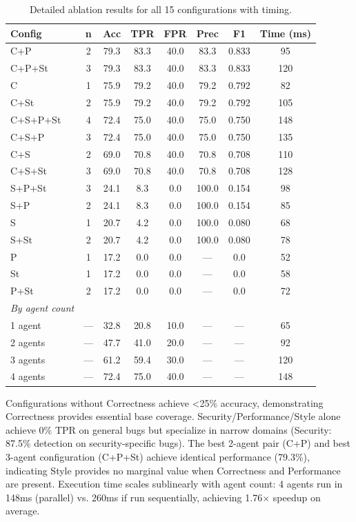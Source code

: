 \documentclass[10pt,twocolumn]{article}
\begin{document}
\begin{table}[h]
\centering
\caption{Detailed ablation results for all 15 configurations with timing.}
\label{tab:ablation_full}
\small
\begin{tabular}{@{}lccccccc@{}}
\toprule
\textbf{Config} & \textbf{n} & \textbf{Acc} & \textbf{TPR} & \textbf{FPR} & \textbf{Prec} & \textbf{F1} & \textbf{Time (ms)} \\
\midrule
C+P & 2 & 79.3 & 83.3 & 40.0 & 83.3 & 0.833 & 95 \\
C+P+St & 3 & 79.3 & 83.3 & 40.0 & 83.3 & 0.833 & 120 \\
C & 1 & 75.9 & 79.2 & 40.0 & 79.2 & 0.792 & 82 \\
C+St & 2 & 75.9 & 79.2 & 40.0 & 79.2 & 0.792 & 105 \\
C+S+P+St & 4 & 72.4 & 75.0 & 40.0 & 75.0 & 0.750 & 148 \\
C+S+P & 3 & 72.4 & 75.0 & 40.0 & 75.0 & 0.750 & 135 \\
C+S & 2 & 69.0 & 70.8 & 40.0 & 70.8 & 0.708 & 110 \\
C+S+St & 3 & 69.0 & 70.8 & 40.0 & 70.8 & 0.708 & 128 \\
S+P+St & 3 & 24.1 & 8.3 & 0.0 & 100.0 & 0.154 & 98 \\
S+P & 2 & 24.1 & 8.3 & 0.0 & 100.0 & 0.154 & 85 \\
S & 1 & 20.7 & 4.2 & 0.0 & 100.0 & 0.080 & 68 \\
S+St & 2 & 20.7 & 4.2 & 0.0 & 100.0 & 0.080 & 78 \\
P & 1 & 17.2 & 0.0 & 0.0 & --- & 0.0 & 52 \\
St & 1 & 17.2 & 0.0 & 0.0 & --- & 0.0 & 58 \\
P+St & 2 & 17.2 & 0.0 & 0.0 & --- & 0.0 & 72 \\
\midrule
\textit{By agent count} \\
1 agent & --- & 32.8 & 20.8 & 10.0 & --- & --- & 65 \\
2 agents & --- & 47.7 & 41.0 & 20.0 & --- & --- & 92 \\
3 agents & --- & 61.2 & 59.4 & 30.0 & --- & --- & 120 \\
4 agents & --- & 72.4 & 75.0 & 40.0 & --- & --- & 148 \\
\bottomrule
\end{tabular}
\end{table}

Configurations without Correctness achieve <25\% accuracy, demonstrating Correctness provides essential base coverage. Security/Performance/Style alone achieve 0\% TPR on general bugs but specialize in narrow domains (Security: 87.5\% detection on security-specific bugs). The best 2-agent pair (C+P) and best 3-agent configuration (C+P+St) achieve identical performance (79.3\%), indicating Style provides no marginal value when Correctness and Performance are present. Execution time scales sublinearly with agent count: 4 agents run in 148ms (parallel) vs. 260ms if run sequentially, achieving 1.76$\times$ speedup on average.
\end{document}
